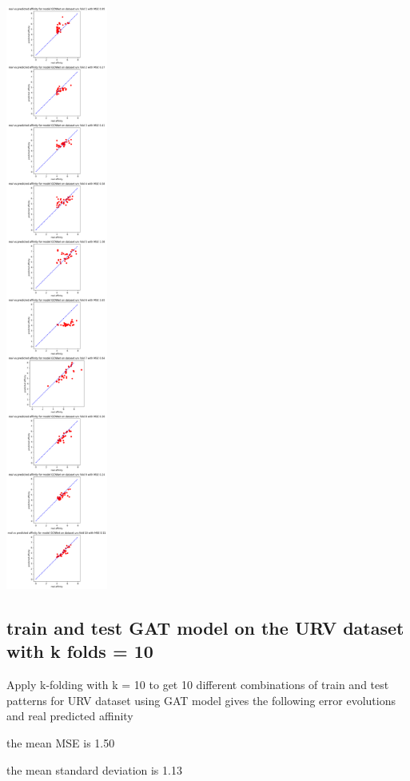 \documentclass[11pt, a4paper]{article}
\begin{document}
    \begin{center}
        \includegraphics[width=0.25\textwidth]{GCN_folds10predictions.png}
    \end{center}

    \subsection{train and test GAT model on the URV dataset with k folds = 10}
    Apply k-folding with k = 10 to get 10 different combinations of train and test patterns for URV dataset using GAT model gives the following error evolutions and real predicted affinity
    
    the mean MSE is 1.50

    the mean standard deviation is 1.13
\end{document}
